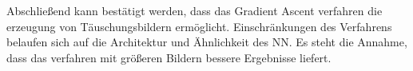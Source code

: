 Abschließend kann bestätigt werden, dass das Gradient Ascent verfahren die erzeugung von Täuschungsbildern ermöglicht. Einschränkungen des Verfahrens belaufen sich auf die Architektur und Ähnlichkeit des \ac{NN}. Es steht die Annahme, dass das verfahren mit größeren Bildern bessere Ergebnisse liefert.